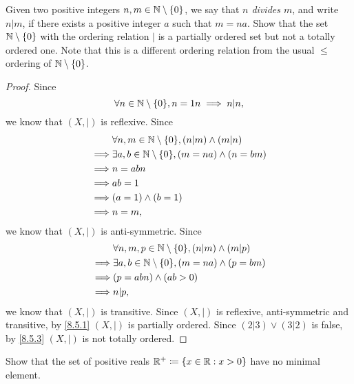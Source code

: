\begin{ex}\label{ex:8.5.3}
  Given two positive integers \(n, m \in \mathbb{N} \setminus \left\lbrace0\right\rbrace\), we say that \emph{\(n\) divides \(m\)}, and write \(n | m\), if there exists a positive integer \(a\) such that \(m = na\).
  Show that the set \(\mathbb{N} \setminus \left\lbrace0\right\rbrace\) with the ordering relation \(|\) is a partially ordered set but not a totally ordered one.
  Note that this is a different ordering relation from the usual \(\leq\) ordering of \(\mathbb{N} \setminus \left\lbrace0\right\rbrace\).
\end{ex}

\begin{proof}
  Since
  \[
    \forall n \in \N \setminus \set{0}, n = 1n \implies n | n,
  \]
  we know that \((X, |)\) is reflexive.
  Since
  \begin{align*}
             & \forall n, m \in \N \setminus \set{0}, (n | m) \land (m | n)   \\
    \implies & \exists a, b \in \N \setminus \set{0}, (m = na) \land (n = bm) \\
    \implies & n = abn                                                        \\
    \implies & ab = 1                                                         \\
    \implies & (a = 1) \land (b = 1)                                          \\
    \implies & n = m,
  \end{align*}
  we know that \((X, |)\) is anti-symmetric.
  Since
  \begin{align*}
             & \forall n, m, p \in \N \setminus \set{0}, (n | m) \land (m | p) \\
    \implies & \exists a, b \in \N \setminus \set{0}, (m = na) \land (p = bm)  \\
    \implies & (p = abn) \land (ab > 0)                                        \\
    \implies & n | p,
  \end{align*}
  we know that \((X, |)\) is transitive.
  Since \((X, |)\) is reflexive, anti-symmetric and transitive, by \cref{8.5.1} \((X, |)\) is partially ordered.
  Since \((2 | 3) \lor (3 | 2)\) is false, by \cref{8.5.3} \((X, |)\) is not totally ordered.
\end{proof}

\begin{ex}\label{ex:8.5.4}
  Show that the set of positive reals \(\mathbb{R}^+ \coloneqq \left\lbrace x \in \mathbb{R} : x > 0\right\rbrace\) have no minimal element.
\end{ex}

